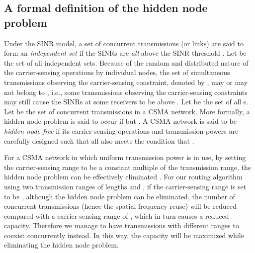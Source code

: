 \documentclass[english]{IEEEtran}
\theoremstyle{plain}
\theoremstyle{plain}
\theoremstyle{plain}
\theoremstyle{remark}
\begin{document}
\subsection{A formal definition of the hidden node problem}

Under the SINR model, a set of concurrent transmissions (or links)
are said to form an \emph{independent set} if the SINRs are \emph{all}
above the SINR threshold . Let  be the set of
all independent sets. Because of the random and distributed nature
of the carrier-sensing operations by individual nodes, the set of
simultaneous transmissions observing the carrier-sensing constraint,
denoted by , may or may not belong to ,
i.e., some transmissions observing the carrier-sensing constraints
may still cause the SINRs at some receivers to be above .
Let  be the set of all s. Let
 be the set of concurrent transmissions in a CSMA network.
More formally, a hidden node problem is said to occur if 
but . A\emph{ }CSMA network is said to be
\emph{hidden node free} if its carrier-sensing operations and transmission
powers are carefully designed such that all 
also meets the condition that .

For a CSMA network in which uniform transmission power is in use,
by setting the carrier-sensing range to be a constant multiple of
the transmission range, the hidden node problem can be effectively
eliminated \cite{Fu12Effective,Chau11Capacity}. For our routing algorithm
using two transmission ranges of lengths  and
 , if the carrier-sensing range is set
to be , although the hidden node problem
can be eliminated, the number of concurrent transmissions (hence the
spatial frequency reuse) will be reduced compared with a carrier-sensing
range of , which in turn causes a reduced capacity.
Therefore we manage to have transmissions with different ranges to
coexist concurrently instead. In this way, the capacity will be maximized
while eliminating the hidden node problem. 
\end{document}
